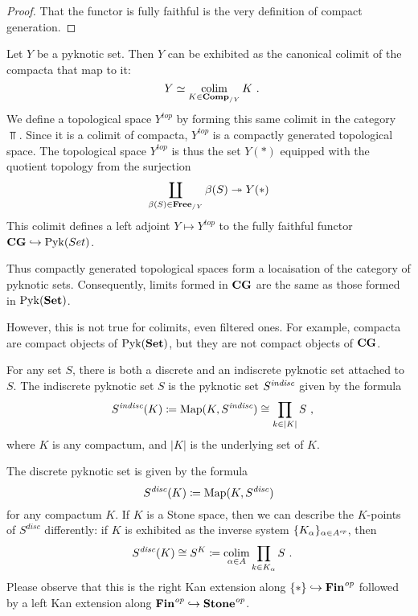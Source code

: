 \begin{proof}
	That the functor is fully faithful is the very definition of compact generation.
\end{proof}

\begin{cnstr}
	Let $ Y $ be a pyknotic set.
	Then $ Y $ can be exhibited as the canonical colimit of the compacta that map to it:
	\[
		Y \simeq \colim_{K \in \Comp_{/Y}} K \period
	\]
	We define a topological space $ Y^{\textit{top}} $ by forming this same colimit in the category $ \Top $.
	Since it is a colimit of compacta, $ Y^{\textit{top}} $ is a compactly generated topological space.
	The topological space $ Y^{\textit{top}} $ is thus the set $ Y(\ast) $ equipped with the quotient topology from the surjection
	\[
		\coprod_{\beta(S) \in \textbf{\textup{Free}}_{/Y}} \beta(S) \twoheadrightarrow Y(\ast)
	\]
	This colimit defines a left adjoint $ Y \mapsto Y^{\textit{top}} $ to the fully faithful functor $ \textbf{\textup{CG}} \hookrightarrow \operatorname{Pyk}(Set) $.

	Thus compactly generated topological spaces form a locaisation of the category of pyknotic sets.
	Consequently, limits formed in $ \textbf{\textup{CG}} $ are the same as those formed in $ \operatorname{Pyk}(\textbf{\textup{Set}}) $.
	
	However, this is not true for colimits, even filtered ones.
	For example, compacta are compact objects of $ \operatorname{Pyk}(\textbf{\textup{Set}}) $, but they are not compact objects of $ \textbf{\textup{CG}} $.
\end{cnstr}

\begin{exm}
	For any set $ S $, there is both a discrete and an indiscrete pyknotic set attached to $ S $.
	The indiscrete pyknotic set $ S $ is the pyknotic set $ S^{\textit{indisc}} $ given by the formula
	\[
		S^{\indisc}(K) \coloneq \Map(K, S^{\indisc}) \cong \prod_{k \in |K|} S \comma
	\]
	where $ K $ is any compactum, and $ |K| $ is the underlying set of $ K $.

	The discrete pyknotic set is given by the formula
	\[
		S^{\textit{disc}}(K) \coloneq \operatorname{Map}(K, S^{\textit{disc}})
	\]
	for any compactum $ K $.
	If $ K $ is a Stone space, then we can describe the $ K $-points of $ S^{disc} $ differently: if $ K $ is exhibited as the inverse system $ \{ K_{\alpha} \}_{\alpha \in A^{\textit{op}}} $, then
	\[
		S^{\disc}(K) \cong S^K \coloneq \colim_{\alpha \in A} \prod_{k \in K_{\alpha}} S \period
	\]
	Please observe that this is the right Kan extension along $ \{ \ast \} \hookrightarrow \textbf{\textup{Fin}}^{\textit{op}} $ followed by a left Kan extension along $ \textbf{\textup{Fin}}^{\textit{op}} \hookrightarrow \textbf{\textup{Stone}}^{\textit{op}} $.
\end{exm}
